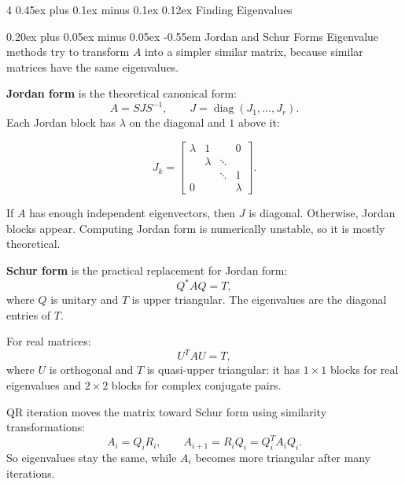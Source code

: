 \documentclass[10pt,a4paper]{article}
\makeatletter
\newcommand{\sheetfontsize}{\fontsize{7.5pt}{8.4pt}\selectfont}
\renewcommand\section{\@startsection{section}{1}{\z@}%
  {0.45ex plus 0.1ex minus 0.1ex}%
  {0.12ex}%
  {\normalfont\normalsize\bfseries}}
\renewcommand\subsection{\@startsection{subsection}{2}{\z@}%
  {0.20ex plus 0.05ex minus 0.05ex}%
  {-0.55em}%
  {\normalfont\sheetfontsize\bfseries}}
\makeatother
\begin{document}
\begin{multicols*}{4}
\section{Finding Eigenvalues}

\subsection{Jordan and Schur Forms}
Eigenvalue methods try to transform $A$ into a simpler similar matrix, because
similar matrices have the same eigenvalues.

\textbf{Jordan form} is the theoretical canonical form:
\[
  A=SJS^{-1}, \qquad J=\operatorname{diag}(J_1,\ldots,J_r).
\]
Each Jordan block has $\lambda$ on the diagonal and $1$ above it:
\begin{tiny}
\[
  J_k=
  \begin{bmatrix}
    \lambda & 1       &        & 0\\
            & \lambda & \ddots & \\
            &         & \ddots & 1\\
    0       &         &        & \lambda
  \end{bmatrix}.
\]
\end{tiny}
If $A$ has enough independent eigenvectors, then $J$ is diagonal. Otherwise,
Jordan blocks appear. Computing Jordan form is numerically unstable, so it is
mostly theoretical.

\textbf{Schur form} is the practical replacement for Jordan form:
\[
  Q^*AQ=T,
\]
where $Q$ is unitary and $T$ is upper triangular. The eigenvalues are the
diagonal entries of $T$.

For real matrices:
\[
  U^TAU=T,
\]
where $U$ is orthogonal and $T$ is quasi-upper triangular: it has $1\times1$
blocks for real eigenvalues and $2\times2$ blocks for complex conjugate pairs.

QR iteration moves the matrix toward Schur form using similarity transformations:
\[
  A_i=Q_iR_i,\qquad A_{i+1}=R_iQ_i=Q_i^TA_iQ_i.
\]
So eigenvalues stay the same, while $A_i$ becomes more triangular after many
iterations.



\end{multicols*}
\end{document}
